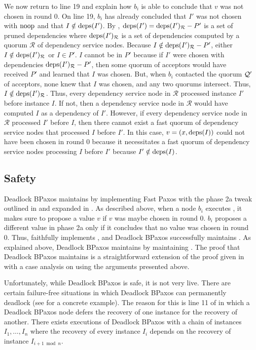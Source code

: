 We now return to line 19 and explain how $b_i$ is able to conclude that $v$ was
not chosen in round $0$. On line 19, $b_i$ has already concluded that $I'$ was
not chosen with $\text{noop}$ and that $I \notin \text{deps}(I')$. By
, $\text{deps}(I') = \text{deps}(I')_{\mathcal{R}} - P'$ is a
set of pruned dependencies where $\text{deps}(I')_{\mathcal{R}}$ is a set of
dependencies computed by a quorum $\mathcal{R}$ of dependency service nodes.
Because $I \notin \text{deps}(I')_{\mathcal{R}} - P'$, either $I \notin
\text{deps}(I')_{\mathcal{R}}$ or $I \in P'$.
%
$I$ cannot be in $P'$ because if $I'$ were chosen with dependencies
$\text{deps}(I')_{\mathcal{R}} - P'$, then some quorum of acceptors would have
received $P'$ and learned that $I$ was chosen. But, when $b_i$ contacted the
quorum $\mathcal{Q}'$ of acceptors, none knew that $I$ was chosen, and any two
quorums intersect.
%
Thus, $I \notin \text{deps}(I')_{\mathcal{R}}$. Thus, every dependency service node
in $\mathcal{R}$ processed instance $I'$ before instance $I$. If not, then a
dependency service node in $\mathcal{R}$ would have computed $I$ as a
dependency of $I'$. However, if every dependency service node in $\mathcal{R}$
processed $I'$ before $I$, then there cannot exist a fast quorum of dependency
service nodes that processed $I$ before $I'$. In this case, $v = (x, \text{deps}(I))$
could not have been chosen in round $0$ because it necessitates a fast quorum
of dependency service nodes processing $I$ before $I'$ because $I' \notin
\text{deps}(I)$.

\subsection{Safety}
Deadlock BPaxos maintains  by implementing Fast
Paxos with the phase 2a tweak outlined in  and expanded
in . As described above, when a node $b_i$ executes
, it makes sure to propose a value $v$ if $v$ was maybe
chosen in round $0$. $b_i$ proposes a different value in phase 2a only if it
concludes that no value was chosen in round $0$. Thus, 
faithfully implements , and Deadlock BPaxos
successfully maintains .
%
As explained above, Deadlock BPaxos maintains  by
maintaining . The proof that Deadlock BPaxos
maintains  is a straightforward extension of the
proof given in  with a case analysis on
 using the arguments presented above.

Unfortunately, while Deadlock BPaxos is safe, it is not very live. There are
certain failure-free situations in which Deadlock BPaxos can permanently
deadlock (see  for a concrete example). The reason
for this is line 11 of  in which a Deadlock BPaxos node
defers the recovery of one instance for the recovery of another. There exists
executions of Deadlock BPaxos with a chain of instances $I_1, \ldots, I_n$
where the recovery of every instance $I_i$ depends on the recovery of instance
$I_{i+1 \bmod n}$.
